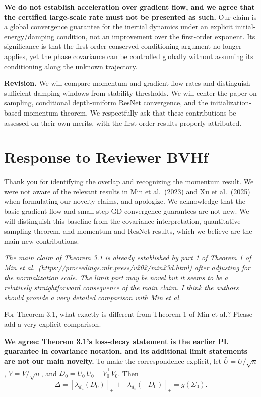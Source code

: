 \documentclass[11pt,a4paper]{article}
\renewenvironment{quote}
  {\par\addvspace{0.8em}\Needspace{8\baselineskip}%
    \list{}{\leftmargin=1.2em\rightmargin=0pt\topsep=0.25em
    \parsep=0.3em}\item\relax\normalsize\itshape\color{quotegray}}
  {\endlist\nopagebreak[4]}
\newif\iffirstreviewer
\newcommand{\reviewer}[1]{%
  \iffirstreviewer\firstreviewerfalse\else\clearpage\fi
  \markright{#1}%
  \section{#1}%
}
\begin{document}
\textbf{We do not establish acceleration over gradient flow, and we agree that the certified large-scale rate must not be presented as such.} Our claim is a global convergence guarantee for the inertial dynamics under an explicit initial-energy/damping condition, not an improvement over the first-order exponent. Its significance is that the first-order conserved conditioning argument no longer applies, yet the phase covariance can be controlled globally without assuming its conditioning along the unknown trajectory.

\textbf{Revision.} We will compare momentum and gradient-flow rates and distinguish sufficient damping windows from stability thresholds. We will center the paper on sampling, conditional depth-uniform ResNet convergence, and the initialization-based momentum theorem. We respectfully ask that these contributions be assessed on their own merits, with the first-order results properly attributed.

\reviewer{Response to Reviewer BVHf}\label{response-to-reviewer-bvhf}

Thank you for identifying the overlap and recognizing the momentum result. We were not aware of the relevant results in Min et al.~(2023) and Xu et al.~(2025) when formulating our novelty claims, and apologize. We acknowledge that the basic gradient-flow and small-step GD convergence guarantees are not new. We will distinguish this baseline from the covariance interpretation, quantitative sampling theorem, and momentum and ResNet results, which we believe are the main new contributions.

\begin{quote}
The main claim of Theorem 3.1 is already established by part 1 of Theorem 1 of Min et al.~(\url{https://proceedings.mlr.press/v202/min23d.html}) after adjusting for the normalization scale. The limit part may be novel but it seems to be a relatively straightforward consequence of the main claim. I think the authors should provide a very detailed comparison with Min et al.

For Theorem 3.1, what exactly is different from Theorem 1 of Min et al.? Please add a very explicit comparison.
\end{quote}

\textbf{We agree: Theorem 3.1's loss-decay statement is the earlier PL guarantee in covariance notation, and its additional limit statements are not our main novelty.} To make the correspondence explicit, let \(\bar U=U/\sqrt n\), \(\bar V=V/\sqrt n\), and \(D_0=\bar U_0^\top\bar U_0-\bar V_0^\top\bar V_0\). Then
\[
\underline\Delta=[\lambda_{d_u}(D_0)]_+ +[\lambda_{d_v}(-D_0)]_+=g(\Sigma_0).
\]
\end{document}
